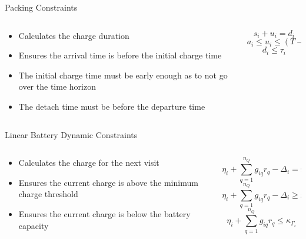 \documentclass[bigger]{beamer}
\begin{document}
\begin{frame}[label={sec:orga4e4df7}]{Packing Constraints}
\begin{columns}
\begin{column}{0.5\columnwidth}
\begin{itemize}
\item Calculates the charge duration
\item Ensures the arrival time is before the initial charge time
\item The initial charge time must be early enough as to not go over the time horizon
\item The detach time must be before the departure time
\end{itemize}
\end{column}

\begin{column}{0.5\columnwidth}
\begin{equation*}
    s_i + u_i = d_i
\end{equation*}
\begin{equation*}
    a_i \leq u_i \leq (T - s_i)
\end{equation*}
\begin{equation*}
    d_i \leq \tau_i
\end{equation*}
\end{column}
\end{columns}
\end{frame}

\begin{frame}[label={sec:orgc18292e}]{Linear Battery Dynamic Constraints}
\begin{columns}
\begin{column}{0.5\columnwidth}
\begin{itemize}
\item Calculates the charge for the next visit
\item Ensures the current charge is above the minimum charge threshold
\item Ensures the current charge is below the battery capacity
\end{itemize}
\end{column}

\begin{column}{0.5\columnwidth}
\begin{equation*}
    \eta_i + \sum_{q=1}^{n_Q} g_{iq} r_q - \Delta_i = \eta_{\gamma_i}
\end{equation*}
\begin{equation*}
    \eta_i + \sum_{q=1}^{n_Q} g_{iq} r_q - \Delta_i \geq \nu_{\Gamma_i} \kappa_{\Gamma_i}
\end{equation*}
\begin{equation*}
    \eta_i + \sum_{q=1}^{n_Q} g_{iq} r_q \leq \kappa_{\Gamma_i}
\end{equation*}
\end{column}
\end{columns}
\end{frame}
\end{document}
